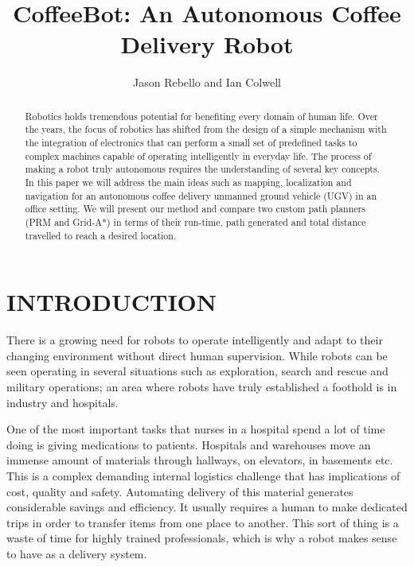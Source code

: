 \documentclass[letterpaper, 10 pt, conference]{ieeeconf}  %
\title{\LARGE \bf
CoffeeBot: An Autonomous Coffee Delivery Robot
}
\author{Jason Rebello and Ian Colwell%
}
\begin{document}
\maketitle
\thispagestyle{empty}
\pagestyle{empty}


\begin{abstract}

Robotics holds tremendous potential for benefiting every domain of human life. Over the years, the focus of robotics has shifted from the design of a simple mechanism with the integration of electronics that can perform a small set of predefined tasks to complex machines capable of operating intelligently in everyday life. The process of making a robot truly autonomous requires the understanding of several key concepts. In this paper we will address the main ideas such as mapping, localization and navigation for an autonomous coffee delivery unmanned ground vehicle (UGV) in an office setting. We will present our method and compare two custom path planners (PRM and Grid-A*) in terms of their run-time, path generated and total distance travelled to reach a desired location.

\end{abstract}

\section{INTRODUCTION}

There is a growing need for robots to operate intelligently and adapt to their changing environment without direct human supervision. While robots can be seen operating in several situations such as exploration, search and rescue and military operations; an area where robots have truly established a foothold is in industry and hospitals.

One of the most important tasks that nurses in a hospital spend a lot of time doing is giving medications to patients. Hospitals and warehouses move an immense amount of materials through hallways, on elevators, in basements etc. This is a complex demanding internal logistics challenge that has implications of cost, quality and safety. Automating delivery of this material generates considerable savings and efficiency. It usually requires a human to make dedicated trips in order to transfer items from one place to another. This sort of thing is a waste of time for highly trained professionals, which is why a robot makes sense to have as a delivery system.
\end{document}
